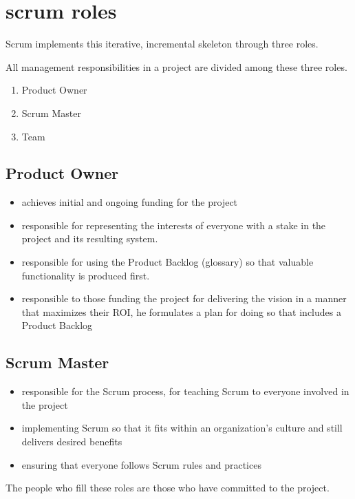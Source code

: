 \section{scrum roles}

Scrum implements this iterative, incremental skeleton through three roles.

All management responsibilities in a project are divided among these three roles.

\begin{enumerate}
  \item Product Owner
  \item Scrum Master
  \item Team
\end{enumerate}


\subsection{Product Owner}

\begin{itemize}
  \item achieves initial and ongoing funding for the project
  \item responsible for representing the interests of everyone with a stake in the project and its resulting system.
  \item responsible for using the Product Backlog (glossary) so that valuable functionality is produced first.
  \item responsible to those funding the project for delivering the vision in a manner that maximizes their ROI, he formulates a plan for doing so that includes a Product Backlog
\end{itemize}


\subsection{Scrum Master}
\begin{itemize}
  \item responsible for the Scrum process, for teaching Scrum to everyone involved in the project
  \item implementing Scrum so that it fits within an organization’s culture and still delivers desired benefits
  \item ensuring that everyone follows Scrum rules and practices
\end{itemize}

The people who fill these roles are those who have committed to the project.

